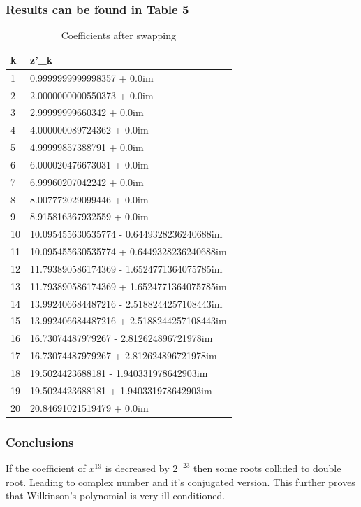 \documentclass[11pt]{article}
\begin{document}
\subsubsection{Results can be found in \textbf{Table 5}}
\begin{table}[!ht]
    \centering
    \caption{Coefficients after swapping}
    \begin{tabular}{|l|l|}
    \hline
        k & z'\_k \\ \hline
        1 & 0.9999999999998357 + 0.0im \\ \hline
        2 & 2.0000000000550373 + 0.0im \\ \hline
        3 & 2.99999999660342 + 0.0im \\ \hline
        4 & 4.000000089724362 + 0.0im \\ \hline
        5 & 4.99999857388791 + 0.0im \\ \hline
        6 & 6.000020476673031 + 0.0im \\ \hline
        7 & 6.99960207042242 + 0.0im \\ \hline
        8 & 8.007772029099446 + 0.0im \\ \hline
        9 & 8.915816367932559 + 0.0im \\ \hline
        10 & 10.095455630535774 - 0.6449328236240688im \\ \hline
        11 & 10.095455630535774 + 0.6449328236240688im \\ \hline
        12 & 11.793890586174369 - 1.6524771364075785im \\ \hline
        13 & 11.793890586174369 + 1.6524771364075785im \\ \hline
        14 & 13.992406684487216 - 2.5188244257108443im \\ \hline
        15 & 13.992406684487216 + 2.5188244257108443im \\ \hline
        16 & 16.73074487979267 - 2.812624896721978im \\ \hline
        17 & 16.73074487979267 + 2.812624896721978im \\ \hline
        18 & 19.5024423688181 - 1.940331978642903im \\ \hline
        19 & 19.5024423688181 + 1.940331978642903im \\ \hline
        20 & 20.84691021519479 + 0.0im \\ \hline
    \end{tabular}
\end{table}
\subsubsection{Conclusions}
If the coefficient of $x^{19}$ is decreased by $2^{-23}$ then some roots collided to double root. Leading to complex number and it's conjugated version.
This further proves that Wilkinson's polynomial is very ill-conditioned.  
\end{document}

